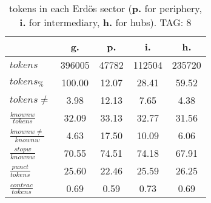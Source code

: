 \begin{table}[h!]
\begin{center}
\begin{tabular}{| l || c | c | c | c |}\hline
 & {\bf g.} & {\bf p.} & {\bf i.} & {\bf h.} \\\hline\hline
$tokens$ & 396005  & 47782  & 112504  & 235720 \\
$tokens_{\%}$ & 100.00  & 12.07  & 28.41  & 59.52 \\
$tokens \neq$ & 3.98  & 12.13  & 7.65  & 4.38 \\\hline
$\frac{knownw}{tokens}$ & 32.09  & 33.13  & 32.77  & 31.56 \\
$\frac{knownw \neq}{knownw}$ & 4.63  & 17.50  & 10.09  & 6.06 \\\hline
$\frac{stopw}{knownw}$ & 70.55  & 74.51  & 74.18  & 67.91 \\
$\frac{punct}{tokens}$ & 25.60  & 22.46  & 25.59  & 26.25 \\
$\frac{contrac}{tokens}$ & 0.69  & 0.59  & 0.73  & 0.69 \\\hline
\end{tabular}
\caption{tokens in each Erd\"os sector ({{\bf p.}} for periphery, {{\bf i.}} for intermediary, 
    {{\bf h.}} for hubs). TAG: 8}
\end{center}
\end{table}